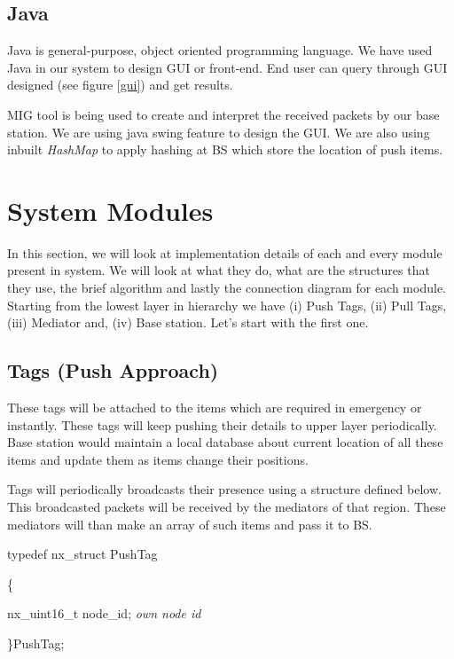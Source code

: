 \documentclass [a4paper,12pt]{book}
\begin{document}
\subsection{Java}
Java is general-purpose, object oriented programming language. We have used Java in our system to design GUI or front-end. End user can query through GUI designed (see figure \ref{gui}) and get results.

MIG tool is being used to create and interpret the received packets by our base station. We are using java swing feature to design the GUI. We are also using inbuilt \emph{HashMap} to apply hashing at BS which store the location of push items.

\section{System Modules}

In this section, we will look at implementation details of each and every module present in system. We will look at what they do, what are the structures that they use, the brief algorithm and lastly the connection diagram for each module. Starting from the lowest layer in hierarchy we have (i) Push Tags, (ii) Pull Tags, (iii) Mediator and, (iv) Base station. Let's start with the first one.

\subsection{Tags (Push Approach)}

These tags will be attached to the items which are required in emergency or instantly. These tags will keep pushing their details to upper layer periodically. Base station would maintain a local database about current location of all these items and update them as items change their positions. 

Tags will periodically broadcasts their presence using a structure defined below. This broadcasted packets will be received by the mediators of that region. These mediators will than make an array of such items and pass it to BS.

\begin{framed}
typedef nx\_struct PushTag

\{

\hspace{2em} nx\_uint16\_t node\_id; \hspace*{2em} \textit{own node id}

\}PushTag;
\end{framed}
\end{document}
